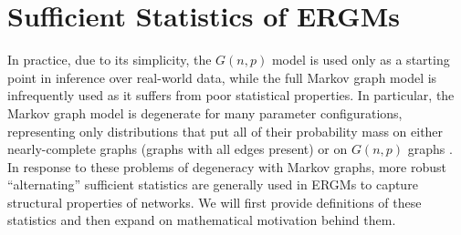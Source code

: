 
\section{Sufficient Statistics of ERGMs}\label{sec:alt_stats}

In practice, due to its simplicity, the $G(n,p)$ model is used only as a starting point in inference over real-world data, while the full Markov graph model is infrequently used as it suffers from poor statistical properties. In particular, the Markov graph model is degenerate for many parameter configurations, representing only distributions that put all of their probability mass on either nearly-complete graphs (graphs with all edges present) or on $G(n,p)$ graphs \cite{Jon99}. In response to these problems of degeneracy with Markov graphs, more robust ``alternating'' sufficient statistics are generally used in ERGMs to capture structural properties of networks.  We will first provide definitions of these statistics and then expand on mathematical motivation behind them.

